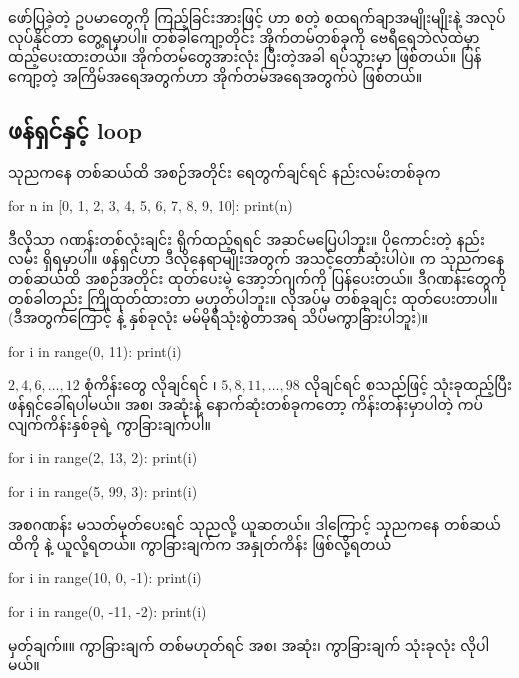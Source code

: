 ဖော်ပြခဲ့တဲ့ ဥပမာတွေကို ကြည့်ခြင်းအားဖြင့်    ဟာ  စတဲ့ စထရက်ချာအမျိုးမျိုးနဲ့ အလုပ်လုပ်နိုင်တာ တွေ့ရမှာပါ။ တစ်ခါကျော့တိုင်း အိုက်တမ်တစ်ခုကို  ဗေရီရေဘဲလ်ထဲမှာ ထည့်ပေးထားတယ်။ အိုက်တမ်တွေအားလုံး ပြီးတဲ့အခါ   ရပ်သွားမှာ ဖြစ်တယ်။ ပြန်ကျော့တဲ့ အကြိမ်အရေအတွက်ဟာ အိုက်တမ်အရေအတွက်ပဲ ဖြစ်တယ်။ 

\subsection*{ ဖန်ရှင်နှင့်  loop}
သုညကနေ တစ်ဆယ်ထိ အစဉ်အတိုင်း ရေတွက်ချင်ရင် နည်းလမ်းတစ်ခုက 
%
\begin{py}
for n in [0, 1, 2, 3, 4, 5, 6, 7, 8, 9, 10]:
    print(n)
\end{py}
%
ဒီလိုသာ ဂဏန်းတစ်လုံးချင်း ရိုက်ထည့်ရရင် အဆင်မပြေပါဘူး။ ပိုကောင်းတဲ့ နည်းလမ်း ရှိရမှာပါ။   ဖန်ရှင်ဟာ ဒီလိုနေရာမျိုးအတွက် အသင့်တော်ဆုံးပါပဲ။  က သုညကနေ တစ်ဆယ်ထိ အစဉ်အတိုင်း ထုတ်ပေးမဲ့  အော့ဘ်ဂျက်ကို ပြန်ပေးတယ်။ ဒီဂဏန်းတွေကို တစ်ခါတည်း ကြိုထုတ်ထားတာ မဟုတ်ပါဘူး။ လိုအပ်မှ တစ်ခုချင်း ထုတ်ပေးတာပါ။ (ဒီအတွက်ကြောင့်  နဲ့  နှစ်ခုလုံး မမ်မိုရီသုံးစွဲတာအရ သိပ်မကွာခြားပါဘူး)။
%
\begin{py}
for i in range(0, 11):
    print(i)
\end{py}
%
$2, 4, 6, \ldots, 12$ စုံကိန်းတွေ လိုချင်ရင် ၊ $5, 8, 11, \ldots, 98$ လိုချင်ရင်  စသည်ဖြင့် သုံးခုထည့်ပြီး ဖန်ရှင်ခေါ်ရပါမယ်။ အစ၊ အဆုံးနဲ့ နောက်ဆုံးတစ်ခုကတော့ ကိန်းတန်းမှာပါတဲ့ ကပ်လျက်ကိန်းနှစ်ခုရဲ့ ကွာခြားချက်ပါ။ 
%
\begin{py}
for i in range(2, 13, 2):
    print(i)

for i in range(5, 99, 3):
    print(i)
\end{py}
%
အစဂဏန်း မသတ်မှတ်ပေးရင် သုညလို့ ယူဆတယ်။ ဒါကြောင့် သုညကနေ တစ်ဆယ်ထိကို  နဲ့ ယူလို့ရတယ်။ ကွာခြားချက်က အနှုတ်ကိန်း ဖြစ်လို့ရတယ်
%
\begin{py}
for i in range(10, 0, -1):
    print(i)

for i in range(0, -11, -2):
    print(i)
\end{py}
%
မှတ်ချက်။\qquad ။ ကွာခြားချက် တစ်မဟုတ်ရင် အစ၊ အဆုံး၊ ကွာခြားချက် သုံးခုလုံး လိုပါမယ်။

